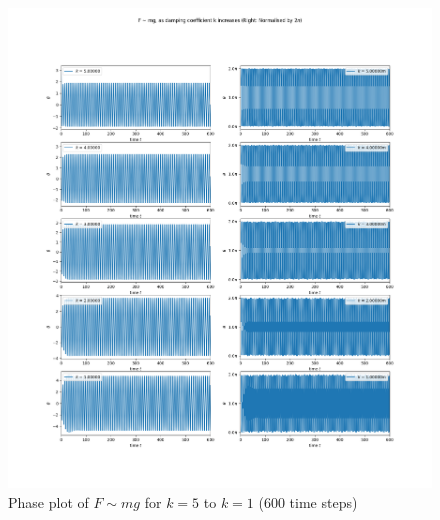 \documentclass[10pt, twocolumn]{article}
\begin{document}
\begin{figure}
    \centering
    \includegraphics[width = \columnwidth]{Projects/ForcedSimplePendulum/Plots/F~mg as damping coefficient k increases from 5 to 1 (long).png}
    \caption{Phase plot of $F \sim{mg}$ for $k = 5$ to $k = 1$ (600 time steps)}
    \label{Phase plot of k 5 to 1 long}
\end{figure}
\end{document}
